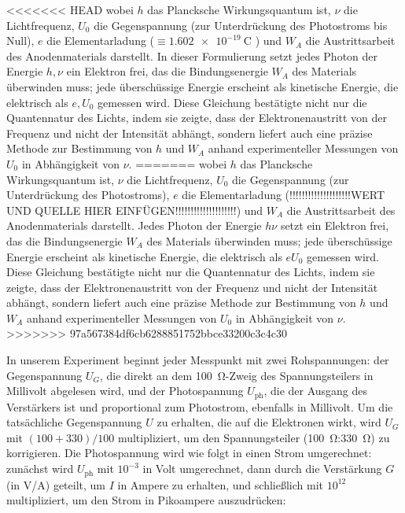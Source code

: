 <<<<<<< HEAD
wobei $h$ das Plancksche Wirkungsquantum ist, $\nu$ die Lichtfrequenz, $U_{0}$ die Gegenspannung (zur Unterdrückung des Photostroms bis Null), $e$ die Elementarladung ($\equiv \SI{1.602e-19}{\coulomb}$ \cite{codata}) und $W_{A}$ die Austrittsarbeit des Anodenmaterials darstellt. In dieser Formulierung setzt jedes Photon der Energie $h,\nu$ ein Elektron frei, das die Bindungsenergie $W_{A}$ des Materials überwinden muss; jede überschüssige Energie erscheint als kinetische Energie, die elektrisch als $e,U_{0}$ gemessen wird. Diese Gleichung bestätigte nicht nur die Quanten­natur des Lichts, indem sie zeigte, dass der Elektronenaustritt von der Frequenz und nicht der Intensität abhängt, sondern liefert auch eine präzise Methode zur Bestimmung von $h$ und $W_{A}$ anhand experimenteller Messungen von $U_{0}$ in Abhängigkeit von $\nu$.
=======
wobei $h$ das Plancksche Wirkungsquantum ist, $\nu$ die Lichtfrequenz, $U_{0}$ die Gegenspannung (zur Unterdrückung des Photostroms), $e$ die Elementarladung (!!!!!!!!!!!!!!!!!!!!WERT UND QUELLE HIER EINFÜGEN!!!!!!!!!!!!!!!!!!!!) und $W_{A}$ die Austrittsarbeit des Anodenmaterials darstellt. Jedes Photon der Energie $h\nu$ setzt ein Elektron frei, das die Bindungsenergie $W_{A}$ des Materials überwinden muss; jede überschüssige Energie erscheint als kinetische Energie, die elektrisch als $eU_{0}$ gemessen wird. Diese Gleichung bestätigte nicht nur die Quanten­natur des Lichts, indem sie zeigte, dass der Elektronenaustritt von der Frequenz und nicht der Intensität abhängt, sondern liefert auch eine präzise Methode zur Bestimmung von $h$ und $W_{A}$ anhand experimenteller Messungen von $U_{0}$ in Abhängigkeit von $\nu$.
>>>>>>> 97a567384df6cb6288851752bbce33200c3c4c30

In unserem Experiment beginnt jeder Messpunkt mit zwei Rohspannungen: der Gegenspannung $U_{G}$, die direkt an dem \SI{100}{\ohm}-Zweig des Spannungsteilers in Millivolt abgelesen wird, und der Photospannung $U_{\mathrm{ph}}$, die der Ausgang des Verstärkers ist und proportional zum Photostrom, ebenfalls in Millivolt. Um die tatsächliche Gegenspannung $U$ zu erhalten, die auf die Elektronen wirkt, wird $U_{G}$ mit $(100+330)/100$ multipliziert, um den Spannungsteiler (\SI{100}{\ohm}:\SI{330}{\ohm}) zu korrigieren. Die Photospannung wird wie folgt in einen Strom umgerechnet: zunächst wird $U_{\mathrm{ph}}$ mit $10^{-3}$ in Volt umgerechnet, dann durch die Verstärkung $G$ (in V/A) geteilt, um $I$ in Ampere zu erhalten, und schließlich mit $10^{12}$ multipliziert, um den Strom in Pikoampere auszudrücken:


